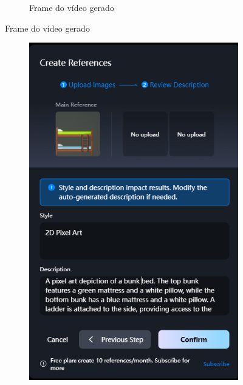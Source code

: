 \begin{figure}[htbp]
\begin{subfigure}{0.4\linewidth}
        \caption{\small Frame do vídeo gerado}
        \label{fig:vidu5b}
    \end{subfigure}
\end{figure}



\begin{figure}[htbp]
    \centering
    \caption{\small Tela da criação da referência da beliche no Vidu}
    \label{fig:viduReferenciaCama}
    \begin{subfigure}{0.4\linewidth}
        \includegraphics[width=1\linewidth]{figs/vidu/tela_referencia_beliche.PNG}

\end{subfigure}
\end{figure}
